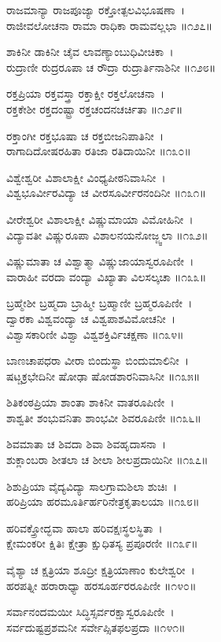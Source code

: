 ರಾಜಮಾನ್ಯಾ ರಾಜಪೂಜ್ಯಾ ರಕ್ತೋತ್ಪಲವಿಭೂಷಣಾ~।\\
ರಾಜೀವಲೋಚನಾ ರಾಮಾ ರಾಧಿಕಾ ರಾಮವಲ್ಲಭಾ ॥೧೨೭॥

ಶಾಕಿನೀ ಡಾಕಿನೀ ಚೈವ ಲಾವಣ್ಯಾಂಬುಧಿವೀಚಿಕಾ~।\\
ರುದ್ರಾಣೀ ರುದ್ರರೂಪಾ ಚ ರೌದ್ರಾ ರುದ್ರಾರ್ತಿನಾಶಿನೀ ॥೧೨೮॥

ರಕ್ತಪ್ರಿಯಾ ರಕ್ತವಸ್ತ್ರಾ ರಕ್ತಾಕ್ಷೀ ರಕ್ತಲೋಚನಾ~।\\
ರಕ್ತಕೇಶೀ ರಕ್ತದಂಷ್ಟ್ರಾ ರಕ್ತಚಂದನಚರ್ಚಿತಾ ॥೧೨೯॥

ರಕ್ತಾಂಗೀ ರಕ್ತಭೂಷಾ ಚ ರಕ್ತಬೀಜನಿಪಾತಿನೀ~।\\
ರಾಗಾದಿದೋಷರಹಿತಾ ರತಿಜಾ ರತಿದಾಯಿನೀ ॥೧೩೦॥

ವಿಶ್ವೇಶ್ವರೀ ವಿಶಾಲಾಕ್ಷೀ ವಿಂಧ್ಯಪೀಠನಿವಾಸಿನೀ~।\\
ವಿಶ್ವಭೂರ್ವೀರವಿದ್ಯಾ ಚ ವೀರಸೂರ್ವೀರನಂದಿನೀ ॥೧೩೧॥

ವೀರೇಶ್ವರೀ ವಿಶಾಲಾಕ್ಷೀ ವಿಷ್ಣುಮಾಯಾ ವಿಮೋಹಿನೀ~।\\
ವಿದ್ಯಾವತೀ ವಿಷ್ಣುರೂಪಾ ವಿಶಾಲನಯನೋಜ್ಜ್ವಲಾ ॥೧೩೨॥

ವಿಷ್ಣುಮಾತಾ ಚ ವಿಶ್ವಾತ್ಮಾ ವಿಷ್ಣುಜಾಯಾಸ್ವರೂಪಿಣೀ~।\\
ವಾರಾಹೀ ವರದಾ ವಂದ್ಯಾ ವಿಖ್ಯಾತಾ ವಿಲಸಲ್ಕಚಾ ॥೧೩೩॥

ಬ್ರಹ್ಮೇಶೀ ಬ್ರಹ್ಮದಾ ಬ್ರಾಹ್ಮೀ ಬ್ರಹ್ಮಾಣೀ ಬ್ರಹ್ಮರೂಪಿಣೀ~।\\
ದ್ವಾರಕಾ ವಿಶ್ವವಂದ್ಯಾ ಚ ವಿಶ್ವಪಾಶವಿಮೋಚನೀ~।\\
ವಿಶ್ವಾಸಕಾರಿಣೀ ವಿಶ್ವಾ ವಿಶ್ವಶಕ್ತಿರ್ವಿಚಕ್ಷಣಾ ॥೧೩೪॥

ಬಾಣಚಾಪಧರಾ ವೀರಾ ಬಿಂದುಸ್ಥಾ ಬಿಂದುಮಾಲಿನೀ~।\\
ಷಟ್ಚಕ್ರಭೇದಿನೀ ಷೋಢಾ ಷೋಡಶಾರನಿವಾಸಿನೀ ॥೧೩೫॥

ಶಿತಿಕಂಠಪ್ರಿಯಾ ಶಾಂತಾ ಶಾಕಿನೀ ವಾತರೂಪಿಣೀ~।\\
ಶಾಶ್ವತೀ ಶಂಭುವನಿತಾ ಶಾಂಭವೀ ಶಿವರೂಪಿಣೀ ॥೧೩೬॥

ಶಿವಮಾತಾ ಚ ಶಿವದಾ ಶಿವಾ ಶಿವಹೃದಾಸನಾ~।\\
ಶುಕ್ಲಾಂಬರಾ ಶೀತಲಾ ಚ ಶೀಲಾ ಶೀಲಪ್ರದಾಯಿನೀ ॥೧೩೭॥

ಶಿಶುಪ್ರಿಯಾ ವೈದ್ಯವಿದ್ಯಾ ಸಾಲಗ್ರಾಮಶಿಲಾ ಶುಚಿಃ~।\\
ಹರಿಪ್ರಿಯಾ ಹರಮೂರ್ತಿರ್ಹರಿನೇತ್ರಕೃತಾಲಯಾ ॥೧೩೮॥

ಹರಿವಕ್ತ್ರೋದ್ಭವಾ ಹಾಲಾ ಹರಿವಕ್ಷಃಸ್ಥಲಸ್ಥಿತಾ~।\\
ಕ್ಷೇಮಂಕರೀ ಕ್ಷಿತಿಃ ಕ್ಷೇತ್ರಾ ಕ್ಷುಧಿತಸ್ಯ ಪ್ರಪೂರಣೀ ॥೧೩೯॥

ವೈಶ್ಯಾ ಚ ಕ್ಷತ್ರಿಯಾ ಶೂದ್ರೀ ಕ್ಷತ್ರಿಯಾಣಾಂ ಕುಲೇಶ್ವರೀ~।\\
ಹರಪತ್ನೀ ಹರಾರಾಧ್ಯಾ ಹರಸೂರ್ಹರರೂಪಿಣೀ ॥೧೪೦॥

ಸರ್ವಾನಂದಮಯೀ ಸಿದ್ಧಿಸ್ಸರ್ವರಕ್ಷಾಸ್ವರೂಪಿಣೀ~।\\
ಸರ್ವದುಷ್ಟಪ್ರಶಮನೀ ಸರ್ವೇಪ್ಸಿತಫಲಪ್ರದಾ ॥೧೪೧॥

